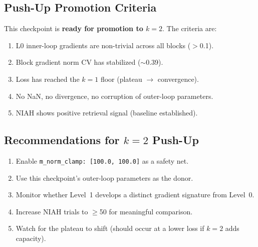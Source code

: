 \documentclass[11pt,a4paper]{article}
\begin{document}
\subsection{Push-Up Promotion Criteria}

This checkpoint is \textbf{ready for promotion to $k{=}2$}. The criteria are:

\begin{enumerate}[topsep=4pt, itemsep=2pt]
    \item[\checkmark] L0 inner-loop gradients are non-trivial across all blocks ($>$0.1).
    \item[\checkmark] Block gradient norm CV has stabilized ($\sim$0.39).
    \item[\checkmark] Loss has reached the $k{=}1$ floor (plateau $\to$ convergence).
    \item[\checkmark] No NaN, no divergence, no corruption of outer-loop parameters.
    \item[\checkmark] NIAH shows positive retrieval signal (baseline established).
\end{enumerate}

\subsection{Recommendations for $k{=}2$ Push-Up}

\begin{enumerate}[topsep=4pt, itemsep=2pt]
    \item Enable \texttt{m\_norm\_clamp: [100.0, 100.0]} as a safety net.
    \item Use this checkpoint's outer-loop parameters as the donor.
    \item Monitor whether Level~1 develops a distinct gradient signature from Level~0.
    \item Increase NIAH trials to $\geq$50 for meaningful comparison.
    \item Watch for the plateau to shift (should occur at a lower loss if $k{=}2$ adds capacity).
\end{enumerate}
\end{document}
